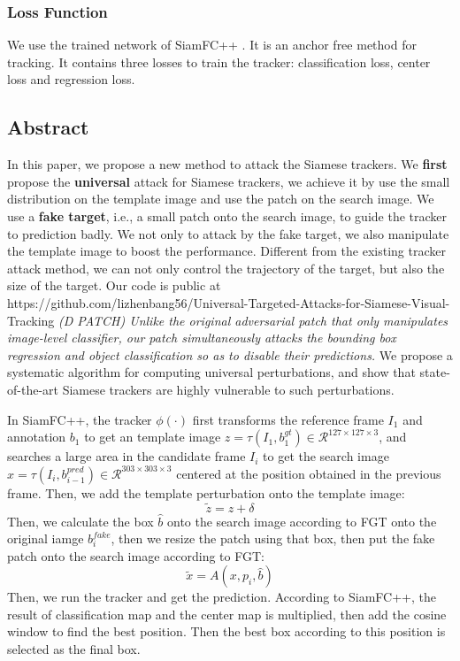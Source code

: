 \documentclass{article}
\begin{document}
\subsubsection{Loss Function}

We use the trained network of SiamFC++ \cite{SiamFC++}.
It is an anchor free method for tracking. It contains three losses to train the tracker: classification loss, center loss and regression loss.

\subsection{Abstract}

In this paper, we propose a new method to attack the Siamese trackers. 
We \textbf{first} propose the \textbf{universal} attack for Siamese trackers, we achieve it by use the small distribution on the template image and use the patch on the search image.
We use a \textbf{fake target}, i.e., a small patch onto the search image, to guide the tracker to prediction badly.
We not only to attack by the fake target, we also manipulate the template image to boost the performance.
Different from the existing tracker attack method, we can not only control the trajectory of the target, but also the size of the target.
Our code is public at https://github.com/lizhenbang56/Universal-Targeted-Attacks-for-Siamese-Visual-Tracking
\textit{(D PATCH) Unlike the original adversarial patch that only manipulates image-level classifier, our patch simultaneously attacks the bounding box regression and object classification so as to disable their predictions.}
We propose a systematic algorithm for computing universal perturbations, and show that state-of-the-art Siamese trackers are highly vulnerable to such perturbations.

In SiamFC++, the tracker $\phi(\cdot)$ first transforms the reference frame $I_1$ and annotation $b_1$ to get an template image $z = \tau (I_1, b^{gt}_1)\in \mathcal{R}^{127\times 127\times 3}$, and searches a large area in the candidate frame $I_i$ to get the search image $x = \tau(I_i, b_{i-1}^{pred})\in \mathcal{R}^{303\times 303 \times 3}$ centered at the position obtained in the previous frame.
Then, we add the template perturbation onto the template image:
\begin{equation}
\tilde z = z + \delta
\end{equation}
Then, we calculate the box $\hat b$ onto the search image according to FGT onto the original iamge $b^{fake}_i$, then we resize the patch using that box, then put the fake patch onto the search image according to FGT:
\begin{equation}
\tilde x = A(x, p_i, \hat b)
\end{equation}
Then, we run the tracker and get the prediction. According to SiamFC++, the result of classification map and the center map is multiplied, then add the cosine window to find the best position. Then the best box according to this position is selected as the final box.
\end{document}
